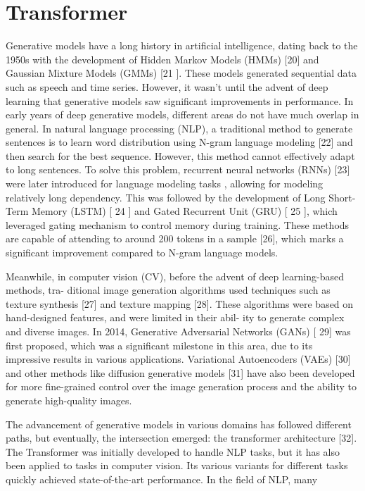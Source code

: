 \documentclass{IEEEtran}
\begin{document}
\section{Transformer}
\par Generative models have a long history in artificial intelligence, dating back to the 1950s with the
development of Hidden Markov Models (HMMs) [20] and Gaussian Mixture Models (GMMs) [21 ].
These models generated sequential data such as speech and time series. However, it wasn’t until
the advent of deep learning that generative models saw significant improvements in performance.
In early years of deep generative models, different areas do not have much overlap in general.
In natural language processing (NLP), a traditional method to generate sentences is to learn
word distribution using N-gram language modeling [22] and then search for the best sequence.
However, this method cannot effectively adapt to long sentences. To solve this problem, recurrent
neural networks (RNNs) [23] were later introduced for language modeling tasks , allowing for
modeling relatively long dependency. This was followed by the development of Long Short-Term
Memory (LSTM) [ 24 ] and Gated Recurrent Unit (GRU) [ 25 ], which leveraged gating mechanism to
control memory during training. These methods are capable of attending to around 200 tokens in a
sample [26], which marks a significant improvement compared to N-gram language models.
\par Meanwhile, in computer vision (CV), before the advent of deep learning-based methods, tra-
ditional image generation algorithms used techniques such as texture synthesis [27] and texture
mapping [28]. These algorithms were based on hand-designed features, and were limited in their abil-
ity to generate complex and diverse images. In 2014, Generative Adversarial Networks (GANs) [ 29]
was first proposed, which was a significant milestone in this area, due to its impressive results
in various applications. Variational Autoencoders (VAEs) [30] and other methods like diffusion
generative models [31] have also been developed for more fine-grained control over the image
generation process and the ability to generate high-quality images.
\par The advancement of generative models in various domains has followed different paths, but
eventually, the intersection emerged: the transformer architecture [32]. The Transformer was 
initially developed to handle NLP tasks, but it has also been applied to tasks in computer vision. 
Its various variants for different tasks quickly achieved state-of-the-art performance. In the field of NLP, many
\end{document}
